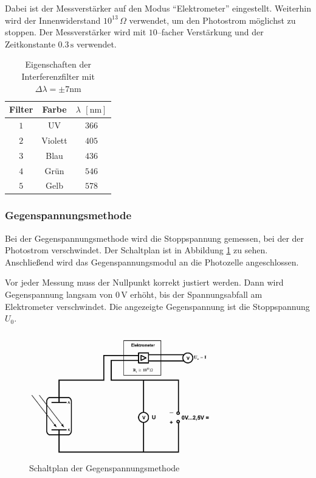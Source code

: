 \documentclass[12pt,a4paper]{scrartcl}
\numberwithin{equation}{section} %
\begin{document}
Dabei ist der Messverstärker auf den Modus ``Elektrometer'' eingestellt. Weiterhin wird der Innenwiderstand $10^{13}\,\Omega$ verwendet, um den Photostrom möglichst zu stoppen. Der Messverstärker wird mit $10$--facher Verstärkung und der Zeitkonstante $0.3\mathrm{\,s}$  verwendet.

\begin{table}[h!]
	\centering
	\begin{tabular}{c|c|c}
		Filter & Farbe & $\lambda$ $[\mathrm{nm}]$ \\
		\hline
		$1$ & UV & $366$ \\
		$2$ & Violett & $405$ \\
		$3$ & Blau & $436$ \\
		$4$ & Grün & $546$ \\
		$5$ & Gelb & $578$ \\
	\end{tabular}
	\caption{Eigenschaften der Interferenzfilter mit $\Delta \lambda = \pm 7\mathrm{nm}$}
	\label{tab:Interferenzfilter}
\end{table}

\subsubsection{Gegenspannungsmethode}
\label{durchführung:Gegenspannung}

Bei der Gegenspannungsmethode wird die Stoppspannung gemessen, bei der der Photostrom verschwindet.  Der Schaltplan ist in Abbildung \ref{fig:Schaltplan Gegenspannungsmethode} zu sehen. Anschließend wird das Gegenspannungsmodul an die Photozelle angeschlossen.

Vor jeder Messung muss der Nullpunkt korrekt justiert werden. Dann wird Gegenspannung langsam von $0\mathrm{\,V}$ erhöht, bis der Spannungsabfall am Elektrometer verschwindet. Die angezeigte Gegenspannung ist die Stoppspannung $U_0$.

\begin{figure}[h!]
	\centering
	\includegraphics[width=0.7\textwidth]{../media/B1.4/Schaltplan_Gegenspannungsmethode.jpg}
	\caption{Schaltplan der Gegenspannungsmethode}
	\label{fig:Schaltplan Gegenspannungsmethode}
\end{figure}
\end{document}
